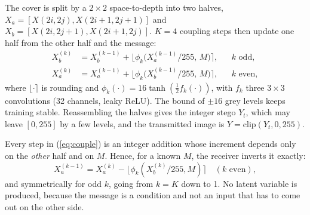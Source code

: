 The cover is split by a $2\times 2$ space-to-depth into two halves, $X_a=[X(2i,2j),X(2i{+}1,2j{+}1)]$ and
$X_b=[X(2i,2j{+}1),X(2i{+}1,2j)]$. $K=4$ coupling steps then update one half from the other half and the message:
\begin{equation}
\begin{aligned}
X_b^{(k)} &= X_b^{(k-1)} + \big\lfloor \phi_k\big(X_a^{(k-1)}/255,\,M\big) \big\rceil, && k \text{ odd},\\
X_a^{(k)} &= X_a^{(k-1)} + \big\lfloor \phi_k\big(X_b^{(k-1)}/255,\,M\big) \big\rceil, && k \text{ even},
\end{aligned}
\label{eq:couple}
\end{equation}
where $\lfloor\cdot\rceil$ is rounding and $\phi_k(\cdot)=16\tanh(\tfrac12 f_k(\cdot))$, with $f_k$ three $3{\times}3$
convolutions (32 channels, leaky ReLU). The bound of $\pm16$ grey levels keeps training stable. Reassembling the halves
gives the integer stego $Y_t$, which may leave $[0,255]$ by a few levels, and the transmitted image is
$Y=\mathrm{clip}(Y_t,0,255)$.

Every step in (\ref{eq:couple}) is an integer addition whose increment depends only on the \emph{other} half and on $M$.
Hence, for a known $M$, the receiver inverts it exactly:
\begin{equation}
X_a^{(k-1)} = X_a^{(k)} - \big\lfloor \phi_k(X_b^{(k)}/255, M) \big\rceil \quad (k \text{ even}),
\label{eq:inv}
\end{equation}
and symmetrically for odd $k$, going from $k=K$ down to 1. No latent variable is produced, because the message is a
condition and not an input that has to come out on the other side.

